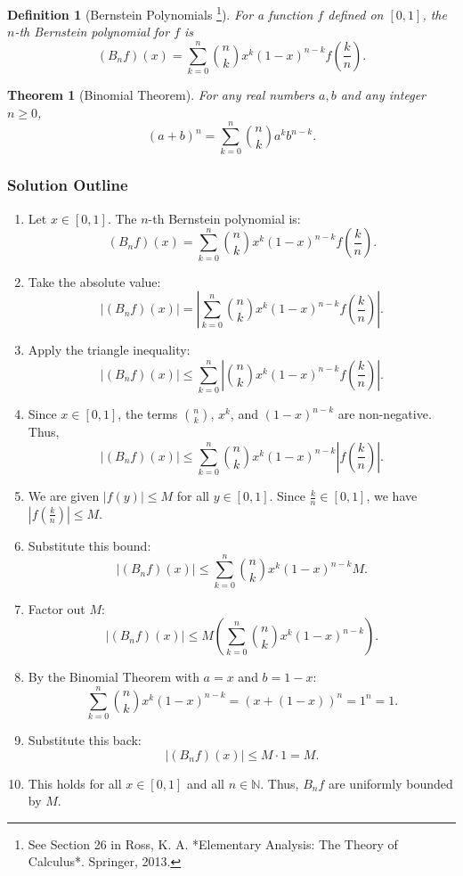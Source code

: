\documentclass{article}
\newtheorem*{definition}{Definition}
\newtheorem*{theorem}{Theorem}
\newcommand{\N}{\mathbb{N}}
\newcommand{\abs}[1]{\left|#1\right|}
\begin{document}
\begin{definition}[Bernstein Polynomials \footnote{See Section 26 in Ross, K. A. *Elementary Analysis: The Theory of Calculus*. Springer, 2013.}]
For a function \(f\) defined on \([0, 1]\), the \(n\)-th Bernstein polynomial for \(f\) is
\[ (B_n f)(x) = \sum_{k=0}^n \binom{n}{k} x^k (1-x)^{n-k} f\left(\frac{k}{n}\right). \]
\end{definition}

\begin{theorem}[Binomial Theorem]
For any real numbers \(a, b\) and any integer \(n \ge 0\),
\[ (a+b)^n = \sum_{k=0}^n \binom{n}{k} a^k b^{n-k}. \]
\end{theorem}

\subsubsection*{Solution Outline}

\begin{enumerate}
    \item Let \(x \in [0, 1]\). The \(n\)-th Bernstein polynomial is:
    \[ (B_n f)(x) = \sum_{k=0}^n \binom{n}{k} x^k (1-x)^{n-k} f\left(\frac{k}{n}\right). \]
    \item Take the absolute value:
    \[ \abs{(B_n f)(x)} = \abs{ \sum_{k=0}^n \binom{n}{k} x^k (1-x)^{n-k} f\left(\frac{k}{n}\right) }. \]
    \item Apply the triangle inequality:
    \[ \abs{(B_n f)(x)} \le \sum_{k=0}^n \abs{ \binom{n}{k} x^k (1-x)^{n-k} f\left(\frac{k}{n}\right) }. \]
    \item Since \(x \in [0, 1]\), the terms \(\binom{n}{k}\), \(x^k\), and \((1-x)^{n-k}\) are non-negative. Thus,
    \[ \abs{(B_n f)(x)} \le \sum_{k=0}^n \binom{n}{k} x^k (1-x)^{n-k} \abs{ f\left(\frac{k}{n}\right) }. \]
    \item We are given \(\abs{f(y)} \le M\) for all \(y \in [0, 1]\). Since \(\frac{k}{n} \in [0, 1]\), we have \(\abs{f(\frac{k}{n})} \le M\).
    \item Substitute this bound:
    \[ \abs{(B_n f)(x)} \le \sum_{k=0}^n \binom{n}{k} x^k (1-x)^{n-k} M. \]
    \item Factor out \(M\):
    \[ \abs{(B_n f)(x)} \le M \left( \sum_{k=0}^n \binom{n}{k} x^k (1-x)^{n-k} \right). \]
    \item By the Binomial Theorem with \(a=x\) and \(b=1-x\):
    \[ \sum_{k=0}^n \binom{n}{k} x^k (1-x)^{n-k} = (x + (1-x))^n = 1^n = 1. \]
    \item Substitute this back:
    \[ \abs{(B_n f)(x)} \le M \cdot 1 = M. \]
    \item This holds for all \(x \in [0, 1]\) and all \(n \in \N\). Thus, \(B_n f\) are uniformly bounded by \(M\).
\end{enumerate}
\end{document}
